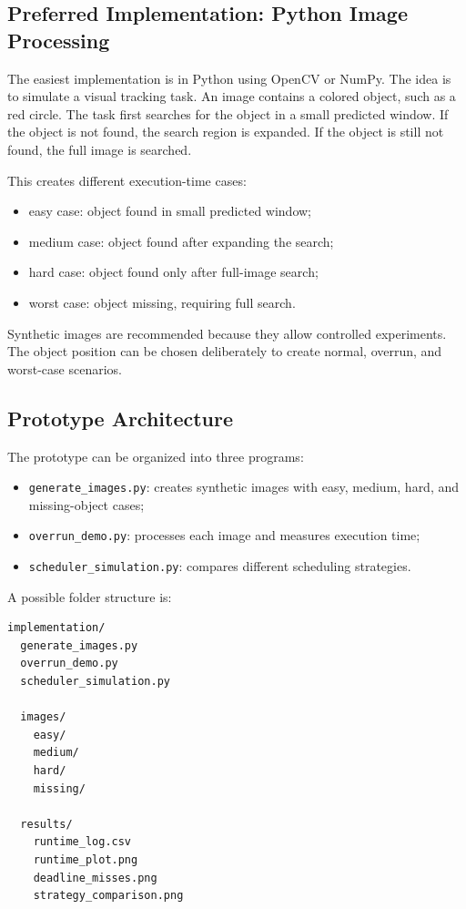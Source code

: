 \documentclass[conference]{IEEEtran}
\begin{document}
\subsection{Preferred Implementation: Python Image Processing}

The easiest implementation is in Python using OpenCV or NumPy. The idea is to simulate a visual tracking task. An image contains a colored object, such as a red circle. The task first searches for the object in a small predicted window. If the object is not found, the search region is expanded. If the object is still not found, the full image is searched.

This creates different execution-time cases:

\begin{itemize}
    \item easy case: object found in small predicted window;
    \item medium case: object found after expanding the search;
    \item hard case: object found only after full-image search;
    \item worst case: object missing, requiring full search.
\end{itemize}

Synthetic images are recommended because they allow controlled experiments. The object position can be chosen deliberately to create normal, overrun, and worst-case scenarios.

\subsection{Prototype Architecture}

The prototype can be organized into three programs:

\begin{itemize}
    \item \texttt{generate\_images.py}: creates synthetic images with easy, medium, hard, and missing-object cases;
    \item \texttt{overrun\_demo.py}: processes each image and measures execution time;
    \item \texttt{scheduler\_simulation.py}: compares different scheduling strategies.
\end{itemize}

A possible folder structure is:

\begin{lstlisting}
implementation/
  generate_images.py
  overrun_demo.py
  scheduler_simulation.py

  images/
    easy/
    medium/
    hard/
    missing/

  results/
    runtime_log.csv
    runtime_plot.png
    deadline_misses.png
    strategy_comparison.png
\end{lstlisting}
\end{document}
